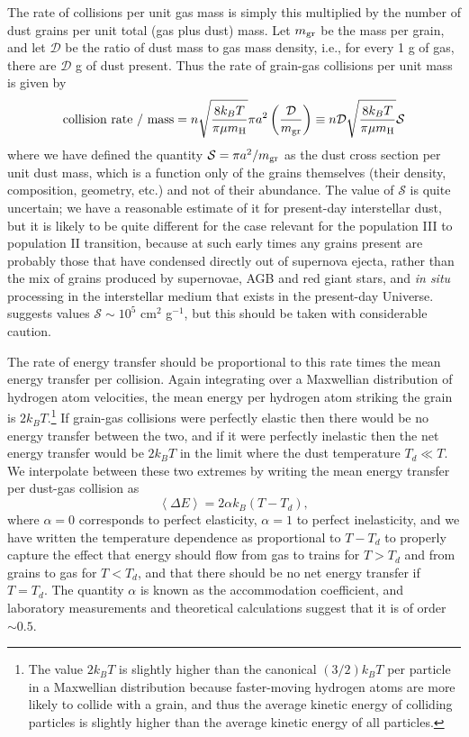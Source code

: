 The rate of collisions per unit gas mass is simply this multiplied by the number of dust grains per unit total (gas plus dust) mass. Let $m_{\rm gr}$ be the mass per grain, and let $\mathcal{D}$ be the ratio of dust mass to gas mass density, i.e., for every 1 g of gas, there are $\mathcal{D}$ g of dust present. Thus the rate of grain-gas collisions per unit mass is given by
\begin{equation}
\mbox{collision rate / mass} =  n \sqrt{\frac{8 k_B T}{\pi \mu m_{\rm H}}} \pi a^2 \left(\frac{\mathcal{D}}{m_{\rm gr}}\right)
\equiv n \mathcal{D} \sqrt{\frac{8 k_B T}{\pi \mu m_{\rm H}}} \mathcal{S}
\end{equation}
where we have defined the quantity $\mathcal{S} = \pi a^2/m_{\rm gr}$ as the dust cross section per unit dust mass, which is a function only of the grains themselves (their density, composition, geometry, etc.) and not of their abundance. The value of $\mathcal{S}$ is quite uncertain; we have a reasonable estimate of it for present-day interstellar dust, but it is likely to be quite different for the case relevant for the population III to population II transition, because at such early times any grains present are probably those that have condensed directly out of supernova ejecta, rather than the mix of grains produced by supernovae, AGB and red giant stars, and \textit{in situ} processing in the interstellar medium that exists in the present-day Universe. \citet{schneider12a} suggests values $\mathcal{S} \sim 10^5$ cm$^2$ g$^{-1}$, but this should be taken with considerable caution.

The rate of energy transfer should be proportional to this rate times the mean energy transfer per collision. Again integrating over a Maxwellian distribution of hydrogen atom velocities, the mean energy per hydrogen atom striking the grain is $2k_B T.$\footnote{The value $2k_B T$ is slightly higher than the canonical $(3/2) k_B T$ per particle in a Maxwellian distribution because faster-moving hydrogen atoms are more likely to collide with a grain, and thus the average kinetic energy of colliding particles is slightly higher than the average kinetic energy of all particles.}  If grain-gas collisions were perfectly elastic then there would be no energy transfer between the two, and if it were perfectly inelastic then the net energy transfer would be $2k_B T$ in the limit where the dust temperature $T_d \ll T$. We interpolate between these two extremes by writing the mean energy transfer per dust-gas collision as
\begin{equation}
\left\langle\Delta E\right\rangle = 2\alpha k_B (T - T_d),
\end{equation}
where $\alpha = 0$ corresponds to perfect elasticity, $\alpha=1$ to perfect inelasticity, and we have written the temperature dependence as proportional to $T-T_d$ to properly capture the effect that energy should flow from gas to trains for $T > T_d$ and from grains to gas for $T < T_d$, and that there should be no net energy transfer if $T=T_d$. The quantity $\alpha$ is known as the accommodation coefficient, and laboratory measurements and theoretical calculations suggest that it is of order $\sim 0.5$.

